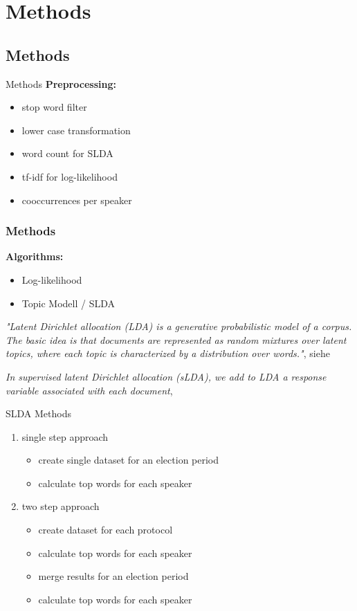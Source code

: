 \documentclass[11pt, a4paper]{beamer}
\begin{document}
\section{Methods} 
\subsection{Methods}
\begin{frame}{Methods}
\textbf{Preprocessing:}
\begin{itemize}
\item stop word filter
\item lower case transformation
\item word count for SLDA
\item tf-idf for log-likelihood
\item cooccurrences per speaker
\end{itemize}
\end{frame}

\begin{frame}
\frametitle{Methods}
\textbf{Algorithms:}
\begin{itemize}
\item Log-likelihood
\item Topic Modell / SLDA
\end{itemize}
\textit {"Latent Dirichlet allocation (LDA) is a generative probabilistic
	model of a corpus. The basic idea is that documents are represented as
 	random mixtures over latent topics, where each topic is characterized by a
 	distribution over words."}, siehe \cite{blatent}
%  	

\textit{In supervised latent Dirichlet allocation (sLDA), we add to LDA a response variable associated with each document}, \cite{BleiSupervisedTopicModels}
\end{frame}

\begin{frame}{SLDA Methods}
\begin{enumerate}
\item single step approach
\begin{itemize}
\item create single dataset for an election period
\item calculate top words for each speaker
\end{itemize}
\item two step approach
\begin{itemize}
\item create dataset for each protocol
\item calculate top words for each speaker
\item merge results for an election period
\item calculate top words for each speaker
\end{itemize}
\end{enumerate}
\end{frame}
\end{document}
